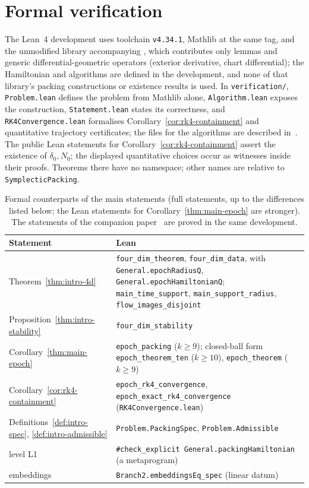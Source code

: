 \section{Formal verification}\label{sec:ver}

\begingroup\sloppy

The Lean~4 development \cite{LeanRepo,Lean4} uses toolchain \texttt{v4.34.1}, Mathlib \cite{Mathlib2020} at the same
tag, and the unmodified library accompanying \cite{OpenAI2026}, which contributes only lemmas and generic
differential-geometric operators (exterior derivative, chart differential); the Hamiltonian and algorithms are defined
in the development, and none of that library's packing constructions or existence results is used. In \texttt{verification/}, \texttt{Problem.lean} defines the problem from Mathlib alone, \texttt{Algorithm.lean} exposes
the construction, \texttt{Statement.lean} states its correctness, and \texttt{RK4Convergence.lean} formalises
Corollary~\ref{cor:rk4-containment} and quantitative trajectory certificates; the files for the algorithms are described
in~\cite{SongHD}. The public Lean statements for Corollary~\ref{cor:rk4-containment} assert the existence of
$\delta_0,N_0$; the displayed quantitative choices occur as witnesses inside their proofs.
Theorems there have no namespace; other names are relative to \texttt{SymplecticPacking}.

\begin{table}[!htbp]
\centering
\footnotesize
\renewcommand{\arraystretch}{1.15}
\begin{tabular}{@{}L{0.2\textwidth}L{0.74\textwidth}@{}}
\toprule
Statement & Lean \\
\midrule
Theorem~\ref{thm:intro-4d} & \texttt{four\_dim\_theorem}, \texttt{four\_dim\_data}, with \texttt{General.epochRadiusQ}, \texttt{General.epochHamiltonianQ}; \texttt{main\_time\_support}, \texttt{main\_support\_radius}, \texttt{flow\_images\_disjoint} \\
Proposition~\ref{thm:intro-stability} & \texttt{four\_dim\_stability} \\
Corollary~\ref{thm:main-epoch} & \texttt{epoch\_packing} ($k\ge9$); closed-ball form \texttt{epoch\_theorem\_ten} ($k\ge10$), \texttt{epoch\_theorem} ($k\ge9$) \\
Corollary~\ref{cor:rk4-containment} & \texttt{epoch\_rk4\_convergence}, \texttt{epoch\_exact\_rk4\_convergence} (\texttt{RK4Convergence.lean}) \\
Definitions~\ref{def:intro-spec}, \ref{def:intro-admissible} & \texttt{Problem.PackingSpec}, \texttt{Problem.Admissible} \\
level L1 & \texttt{\#check\_explicit General.packingHamiltonian} (a metaprogram) \\
embeddings & \texttt{Branch2.embeddingsEq\_spec} (linear datum) \\
\bottomrule
\end{tabular}
\caption{Formal counterparts of the main statements (full statements, up to the differences listed below; the Lean
statements for Corollary~\ref{thm:main-epoch} are stronger). The statements of the companion paper~\cite{SongHD} are
proved in the same development.}
\label{tab:ver-coverage}\label{tab:ver-levels}
\end{table}

